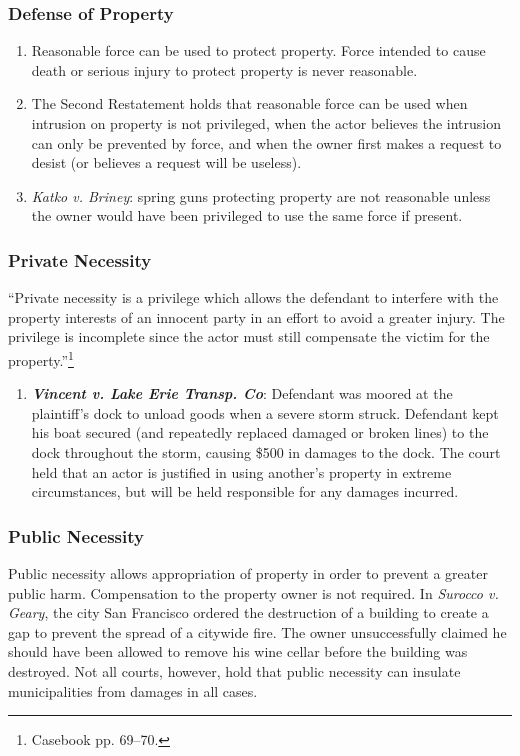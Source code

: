 \subsubsection{Defense of Property}

\begin{enumerate}
    \item Reasonable force can be used to protect property. Force intended to cause death or serious injury to protect property is never reasonable.
    \item The Second Restatement holds that reasonable force can be used when intrusion on property is not privileged, when the actor believes the intrusion can only be prevented by force, and when the owner first makes a request to desist (or believes a request will be useless).
    \item \emph{Katko v. Briney}: spring guns protecting property are not reasonable unless the owner would have been privileged to use the same force if present.
\end{enumerate}

\subsubsection{Private Necessity}

``Private necessity is a privilege which allows the defendant to interfere with the property interests of an innocent party in an effort to avoid a greater injury. The privilege is incomplete since the actor must still compensate the victim for the property.''\footnote{Casebook pp. 69--70.}

\begin{enumerate}
    \item \textbf{\emph{Vincent v. Lake Erie Transp. Co}}: Defendant was moored at the plaintiff's dock to unload goods when a severe storm struck. Defendant kept his boat secured (and repeatedly replaced damaged or broken lines) to the dock throughout the storm, causing \$500 in damages to the dock. The court held that an actor is justified in using another's property in extreme circumstances, but will be held responsible for any damages incurred.
\end{enumerate}

\subsubsection{Public Necessity}

Public necessity allows appropriation of property in order to prevent a greater public harm. Compensation to the property owner is not required. In \emph{Surocco v. Geary}, the city San Francisco ordered the destruction of a building to create a gap to prevent the spread of a citywide fire. The owner unsuccessfully claimed he should have been allowed to remove his wine cellar before the building was destroyed. Not all courts, however, hold that public necessity can insulate municipalities from damages in all cases.

